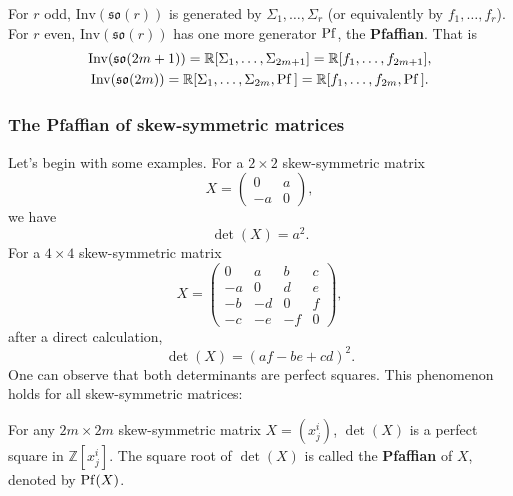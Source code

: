 \begin{fact}
    For $r$ odd, $\mathrm{Inv}(\mathfrak{so}(r))$ is generated by $\Sigma_1,\dots,\Sigma_r$ (or equivalently by $f_1,\dots,f_r$).
    For $r$ even, $\mathrm{Inv}(\mathfrak{so}(r))$ has one more generator ${\rm Pf}$, the \textbf{Pfaffian}. 
    That is
    \begin{gather*}
        \mathrm{Inv}(\mathfrak{so}(2m+1)) = \mathbb{R}[\Sigma_1,\dots,\Sigma_{2m+1}] = \mathbb{R}[f_1,\dots,f_{2m+1}], \\
        \mathrm{Inv}(\mathfrak{so}(2m)) = \mathbb{R}[\Sigma_1,\dots,\Sigma_{2m},{\rm Pf}\,] = \mathbb{R}[f_1,\dots,f_{2m},{\rm Pf}\,].
    \end{gather*}
\end{fact}

\subsubsection*{The Pfaffian of skew-symmetric matrices}
Let's begin with some examples. For a $2\times 2$ skew-symmetric matrix 
\begin{equation*}
    X = 
    \begin{pmatrix}
        0 & a \\
        -a & 0
    \end{pmatrix},
\end{equation*}
we have 
\begin{equation*}
    \det(X) = a^2.
\end{equation*}
For a $4\times 4$ skew-symmetric matrix
\begin{equation*}
    X = 
    \begin{pmatrix}
        0 & a & b & c \\
        -a & 0 & d & e \\
        -b & -d & 0 & f \\
        -c & -e & -f & 0
    \end{pmatrix},
\end{equation*}
after a direct calculation, 
\begin{equation*}
    \det(X) = (af - be + cd)^2.
\end{equation*}
One can observe that both determinants are perfect squares. 
This phenomenon holds for all skew-symmetric matrices:
\begin{fact}
    For any $2m\times 2m$ skew-symmetric matrix $X=(x^i_j)$, 
    $\det(X)$ is a perfect square in $\mathbb{Z}[x^i_j]$. 
    The square root of $\det(X)$ is called the \textbf{Pfaffian} of $X$, 
    denoted by ${\rm Pf}(X)$. 
\end{fact}
